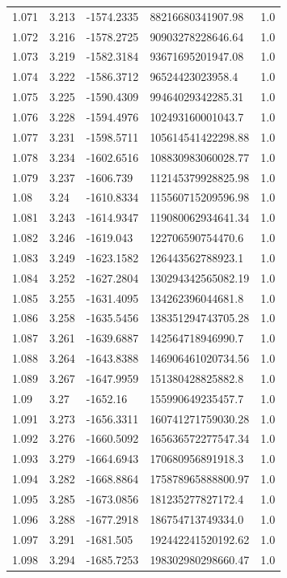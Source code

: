 \begin{tabular}{lllll}
1.071 & 3.213 & -1574.2335 & 88216680341907.98 & 1.0 \\
1.072 & 3.216 & -1578.2725 & 90903278228646.64 & 1.0 \\
1.073 & 3.219 & -1582.3184 & 93671695201947.08 & 1.0 \\
1.074 & 3.222 & -1586.3712 & 96524423023958.4 & 1.0 \\
1.075 & 3.225 & -1590.4309 & 99464029342285.31 & 1.0 \\
1.076 & 3.228 & -1594.4976 & 102493160001043.7 & 1.0 \\
1.077 & 3.231 & -1598.5711 & 105614541422298.88 & 1.0 \\
1.078 & 3.234 & -1602.6516 & 108830983060028.77 & 1.0 \\
1.079 & 3.237 & -1606.739 & 112145379928825.98 & 1.0 \\
1.08 & 3.24 & -1610.8334 & 115560715209596.98 & 1.0 \\
1.081 & 3.243 & -1614.9347 & 119080062934641.34 & 1.0 \\
1.082 & 3.246 & -1619.043 & 122706590754470.6 & 1.0 \\
1.083 & 3.249 & -1623.1582 & 126443562788923.1 & 1.0 \\
1.084 & 3.252 & -1627.2804 & 130294342565082.19 & 1.0 \\
1.085 & 3.255 & -1631.4095 & 134262396044681.8 & 1.0 \\
1.086 & 3.258 & -1635.5456 & 138351294743705.28 & 1.0 \\
1.087 & 3.261 & -1639.6887 & 142564718946990.7 & 1.0 \\
1.088 & 3.264 & -1643.8388 & 146906461020734.56 & 1.0 \\
1.089 & 3.267 & -1647.9959 & 151380428825882.8 & 1.0 \\
1.09 & 3.27 & -1652.16 & 155990649235457.7 & 1.0 \\
1.091 & 3.273 & -1656.3311 & 160741271759030.28 & 1.0 \\
1.092 & 3.276 & -1660.5092 & 165636572277547.34 & 1.0 \\
1.093 & 3.279 & -1664.6943 & 170680956891918.3 & 1.0 \\
1.094 & 3.282 & -1668.8864 & 175878965888800.97 & 1.0 \\
1.095 & 3.285 & -1673.0856 & 181235277827172.4 & 1.0 \\
1.096 & 3.288 & -1677.2918 & 186754713749334.0 & 1.0 \\
1.097 & 3.291 & -1681.505 & 192442241520192.62 & 1.0 \\
1.098 & 3.294 & -1685.7253 & 198302980298660.47 & 1.0 \\

\end{tabular}
